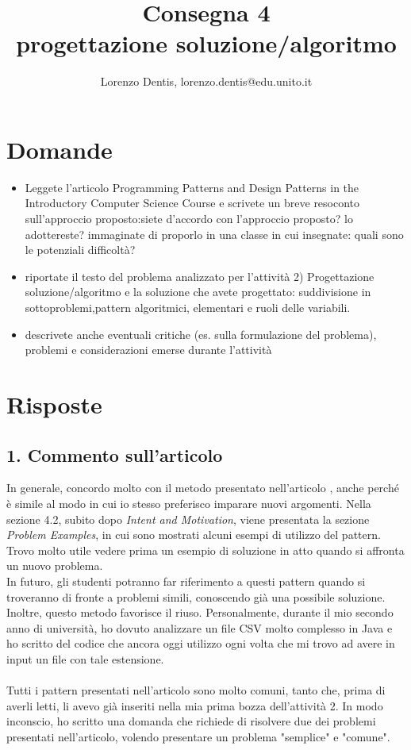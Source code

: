 \documentclass[a4paper]{article}
\begin{document}
\author{Lorenzo Dentis, lorenzo.dentis@edu.unito.it}
\title{Consegna 4 \\ \large progettazione soluzione/algoritmo}
\maketitle

\section{Domande}
\begin{itemize}
	\item Leggete l'articolo Programming Patterns and Design Patterns in the Introductory Computer Science Course e scrivete un breve resoconto sull'approccio proposto:siete d'accordo con l'approccio proposto? lo adottereste? immaginate di proporlo in una classe in cui insegnate: quali sono le potenziali difficoltà?
	\item riportate il testo del problema analizzato per l'attività 2) Progettazione soluzione/algoritmo e la soluzione che avete progettato: suddivisione in sottoproblemi,pattern algoritmici, elementari e ruoli delle variabili.
	\item descrivete anche eventuali critiche (es. sulla formulazione del problema), problemi e considerazioni emerse durante l'attività
\end{itemize}
\section{Risposte}
\subsection{1. Commento sull'articolo}
In generale, concordo molto con il metodo presentato nell'articolo \cite{articolo}, anche perché è simile al modo in cui io stesso preferisco imparare nuovi argomenti. 
Nella sezione 4.2, subito dopo \textit{Intent and Motivation}, viene presentata la sezione \textit{Problem Examples}, in cui sono mostrati alcuni esempi di utilizzo del pattern. 
Trovo molto utile vedere prima un esempio di soluzione in atto quando si affronta un nuovo problema.\\

In futuro, gli studenti potranno far riferimento a questi pattern quando si troveranno di fronte a problemi simili, conoscendo già una possibile soluzione.
Inoltre, questo metodo favorisce il riuso. 
Personalmente, durante il mio secondo anno di università, ho dovuto analizzare un file CSV molto complesso in Java e ho scritto del codice che ancora oggi utilizzo ogni volta che mi trovo ad avere in input un file con tale estensione.\\\\
Tutti i pattern presentati nell'articolo sono molto comuni, tanto che, prima di averli letti, li avevo già inseriti nella mia prima bozza dell'attività 2. In modo inconscio, ho scritto una domanda che richiede di risolvere due dei problemi presentati nell'articolo, volendo presentare un problema "semplice" e "comune".\\
\end{document}
